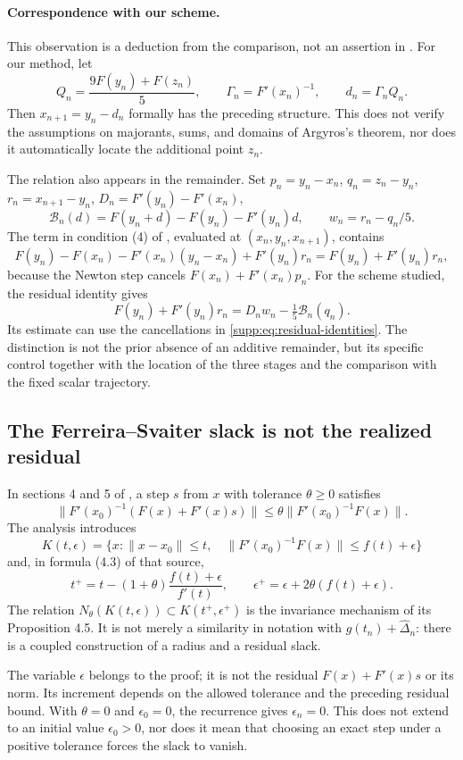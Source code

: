 \documentclass[11pt,a4paper]{article}
\numberwithin{equation}{section}
\numberwithin{table}{section}
\theoremstyle{plain}
\theoremstyle{definition}\newtheorem{definition}[theorem]{Definition}
\theoremstyle{remark}\newtheorem{remark}[theorem]{Remark}
\begin{document}
\paragraph{Correspondence with our scheme.}
This observation is a deduction from the comparison, not an assertion
in \cite{Argyros1996}. For our method, let
\[
 Q_n=\frac{9F(y_n)+F(z_n)}5,\qquad
 \Gamma_n=F'(x_n)^{-1},\qquad d_n=\Gamma_nQ_n.
\]
Then $x_{n+1}=y_n-d_n$ formally has the preceding structure.
This does not verify the assumptions on majorants, sums, and domains
of Argyros's theorem, nor does it automatically locate the additional
point $z_n$.

The relation also appears in the remainder. Set $p_n=y_n-x_n$,
$q_n=z_n-y_n$, $r_n=x_{n+1}-y_n$, $D_n=F'(y_n)-F'(x_n)$,
\[
 \mathcal B_n(d)=F(y_n+d)-F(y_n)-F'(y_n)d,\qquad w_n=r_n-q_n/5.
\]
The term in condition (4) of \cite{Argyros1996}, evaluated at
$(x_n,y_n,x_{n+1})$, contains
\[
 F(y_n)-F(x_n)-F'(x_n)(y_n-x_n)+F'(y_n)r_n
 =F(y_n)+F'(y_n)r_n,
\]
because the Newton step cancels $F(x_n)+F'(x_n)p_n$.
For the scheme studied, the residual identity gives
\[
 F(y_n)+F'(y_n)r_n=D_nw_n-\tfrac15\mathcal B_n(q_n).
\]
Its estimate can use the cancellations in \eqref{supp:eq:residual-identities}.
The distinction is not the prior absence of an additive remainder,
but its specific control together with the location of the three
stages and the comparison with the fixed scalar trajectory.

\subsection{The Ferreira--Svaiter slack is not the realized residual}
In sections 4 and 5 of \cite{FerreiraSvaiter2012}, a step $s$ from
$x$ with tolerance $\theta\geq0$ satisfies
\[
 \|F'(x_0)^{-1}(F(x)+F'(x)s)\|
 \leq\theta\|F'(x_0)^{-1}F(x)\|.
\]
The analysis introduces
\[
 K(t,\epsilon)=\{x:\|x-x_0\|\leq t,\quad
 \|F'(x_0)^{-1}F(x)\|\leq f(t)+\epsilon\}
\]
and, in formula (4.3) of that source,
\begin{equation}
 t^+=t-(1+\theta)\frac{f(t)+\epsilon}{f'(t)},\qquad
 \epsilon^+=\epsilon+2\theta(f(t)+\epsilon).
 \label{supp:eq:FS-update}
\end{equation}
The relation $N_\theta(K(t,\epsilon))\subset K(t^+,\epsilon^+)$
is the invariance mechanism of its Proposition 4.5. It is not merely
a similarity in notation with $g(t_n)+\widehat\Delta_n$: there is
a coupled construction of a radius and a residual slack.

The variable $\epsilon$ belongs to the proof; it is not the residual
$F(x)+F'(x)s$ or its norm. Its increment depends on the allowed
tolerance and the preceding residual bound. With $\theta=0$ and
$\epsilon_0=0$, the recurrence gives $\epsilon_n=0$. This does not
extend to an initial value $\epsilon_0>0$, nor does it mean that
choosing an exact step under a positive tolerance forces the slack
to vanish.
\end{document}
